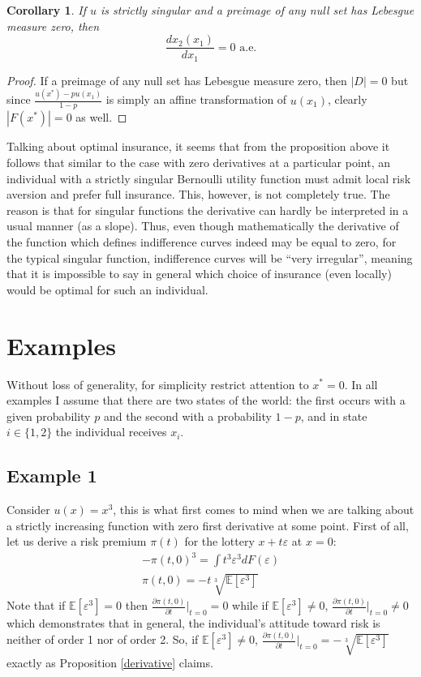 \documentclass[a4paper]{article}
\newcommand{\expect}{\mathbb{E}}
\newcommand{\eps}{\varepsilon}
\newtheorem{corollary}{Corollary}[theorem]
\begin{document}
\begin{corollary}
	If $u$ is strictly singular and a preimage of any null set has Lebesgue measure zero, then $$\frac{dx_2(x_1)}{dx_1} = 0 \text{ a.e.}$$
\end{corollary}
\begin{proof}
If a preimage of any null set has Lebesgue measure zero, then $|D| = 0$ but since $\frac{u(x^*) - pu(x_1)}{1-p}$ is simply an affine transformation of $u(x_1)$, clearly $|F(x^*)| = 0$ as well.
\end{proof}
Talking about optimal insurance, it seems that from the proposition above it follows that similar to the case with zero derivatives at a particular point, an individual with a strictly singular Bernoulli utility function must admit local risk aversion and prefer full insurance. This, however, is not completely true. The reason is that for singular functions the derivative can hardly be interpreted in a usual manner (as a slope). Thus, even though mathematically the derivative of the function which defines indifference curves indeed may be equal to zero, for the typical singular function, indifference curves will be ``very irregular'', meaning that it is impossible to say in general which choice of insurance (even locally) would be optimal for such an individual.

\section{Examples}\label{Examples}
Without loss of generality, for simplicity restrict attention to $x^* = 0$. In all examples I assume that there are two states of the world: the first occurs with a given probability $p$ and the second with a probability $1-p$, and in state $i\in\{1, 2\}$ the individual receives $x_i$.
\subsection{Example 1}
Consider $u(x) = x^3$, this is what first comes to mind when we are talking about a strictly increasing function with zero first derivative at some point. First of all, let us derive a risk premium $\pi(t)$ for the lottery $x+t\eps$ at $x = 0$:
\begin{align}
	-\pi(t, 0)^3 = \int t^3 \eps^3 dF(\eps)\\
	\pi(t, 0) = -t \sqrt[3]{\expect[\eps^3]}
\end{align}
Note that if $\expect[\eps^3] = 0$ then $\frac{\partial \pi(t, 0)}{\partial t}\bigg|_{t=0} = 0$ while if $\expect[\eps^3] \neq 0$, $\frac{\partial \pi(t, 0)}{\partial t}\bigg|_{t=0} \neq 0$ which demonstrates that in general, the individual's attitude toward risk is neither of order 1 nor of order 2.
So, if $\expect[\eps^3] \neq 0$, $\frac{\partial \pi(t, 0)}{\partial t}\bigg|_{t=0} = -\sqrt[3]{\expect[\eps^3]}$ exactly as Proposition \ref{derivative} claims.
\end{document}
